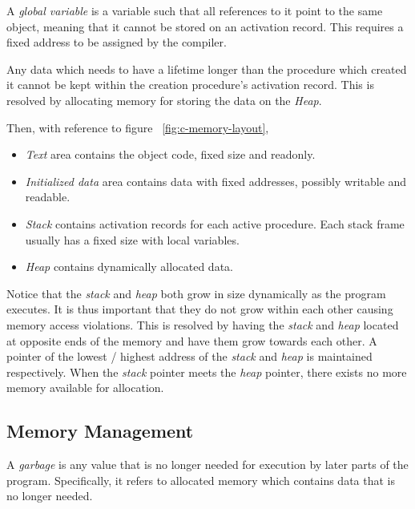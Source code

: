 \begin{definition}
    A \textit{global variable} is a variable such that all references to it point to the same object, meaning that it cannot be stored on an activation record. This requires a fixed address to be assigned by the compiler.
\end{definition}

\begin{definition}
    Any data which needs to have a lifetime longer than the procedure which created it cannot be kept within the creation procedure's activation record. This is resolved by allocating memory for storing the data on the \textit{Heap}.
\end{definition}

\begin{remark}
    Then, with reference to figure ~\ref{fig:c-memory-layout},
    \begin{itemize}
        \item \textit{Text} area contains the object code, fixed size and readonly.
        \item \textit{Initialized data} area contains data with fixed addresses, possibly writable and readable.
        \item \textit{Stack} contains activation records for each active procedure. Each stack frame usually has a fixed size with local variables.
        \item \textit{Heap} contains dynamically allocated data.
    \end{itemize}
    
    Notice that the \textit{stack} and \textit{heap} both grow in size dynamically as the program executes. It is thus important that they do not grow within each other causing memory access violations. This is resolved by having the \textit{stack} and \textit{heap} located at opposite ends of the memory and have them grow towards each other. A pointer of the lowest / highest address of the \textit{stack} and \textit{heap} is maintained respectively. When the \textit{stack} pointer meets the \textit{heap} pointer, there exists no more memory available for allocation.
\end{remark}

\subsection{Memory Management}

\begin{definition}[Garbage]
    A \textit{garbage} is any value that is no longer needed for execution by later parts of the program. Specifically, it refers to allocated memory which contains data that is no longer needed.
\end{definition}
